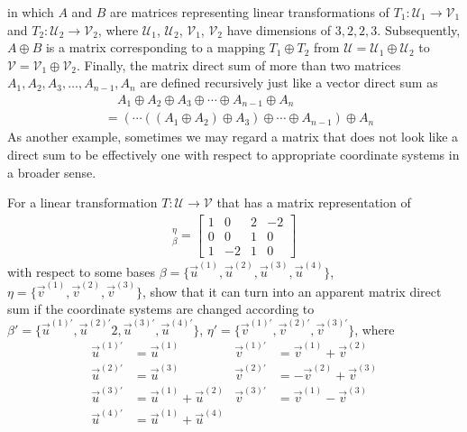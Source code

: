 in which $A$ and $B$ are matrices representing linear transformations of $T_1: \mathcal{U}_1 \to \mathcal{V}_1$ and $T_2: \mathcal{U}_2 \to \mathcal{V}_2$, where $\mathcal{U}_1$, $\mathcal{U}_2$, $\mathcal{V}_1$, $\mathcal{V}_2$ have dimensions of $3,2,2,3$. Subsequently, $A \oplus B$ is a matrix corresponding to a mapping $T_1 \oplus T_2$ from $\mathcal{U} = \mathcal{U}_1 \oplus \mathcal{U}_2$ to $\mathcal{V} = \mathcal{V}_1 \oplus \mathcal{V}_2$. Finally, the matrix direct sum of more than two matrices $A_1, A_2, A_3, \ldots, A_{n-1}, A_n$ are defined recursively just like a vector direct sum as
\begin{align*}
&\quad A_1 \oplus A_2 \oplus A_3 \oplus \cdots \oplus A_{n-1} \oplus A_n \\
&= (\cdots ((A_1 \oplus A_2) \oplus A_3) \oplus \cdots \oplus A_{n-1}) \oplus A_n
\end{align*}
As another example, sometimes we may regard a matrix that does not look like a direct sum to be effectively one with respect to appropriate coordinate systems in a broader sense.
\begin{exmp}
For a linear transformation $T: \mathcal{U} \to \mathcal{V}$ that has a matrix representation of
\begin{align*}
[T]_\beta^\eta =
\begin{bmatrix}
1 & 0 & 2 & -2 \\
0 & 0 & 1 & 0 \\
1 & -2 & 1 & 0
\end{bmatrix} 
\end{align*}
with respect to some bases $\mathcal{\beta} = \{\vec{u}^{(1)}, \vec{u}^{(2)}, \vec{u}^{(3)}, \vec{u}^{(4)}\}$, $\mathcal{\eta} = \{\vec{v}^{(1)}, \vec{v}^{(2)}, \vec{v}^{(3)}\}$, show that it can turn into an apparent matrix direct sum if the coordinate systems are changed according to $\mathcal{\beta}' = \{\vec{u}^{(1)'}, \vec{u}^{(2)'}2, \vec{u}^{(3)'}, \vec{u}^{(4)'}\}$, $\mathcal{\eta}' = \{\vec{v}^{(1)'}, \vec{v}^{(2)'}, \vec{v}^{(3)'}\}$, where
\begin{align*}
\vec{u}^{(1)'} &= \vec{u}^{(1)} & \vec{v}^{(1)'} &= \vec{v}^{(1)} + \vec{v}^{(2)} \\
\vec{u}^{(2)'} &= \vec{u}^{(3)} & \vec{v}^{(2)'} &= -\vec{v}^{(2)} + \vec{v}^{(3)} \\
\vec{u}^{(3)'} &= \vec{u}^{(1)} + \vec{u}^{(2)} & \vec{v}^{(3)'} &= \vec{v}^{(1)} - \vec{v}^{(3)} \\
\vec{u}^{(4)'} &= \vec{u}^{(1)} + \vec{u}^{(4)}
\end{align*}
\end{exmp}
